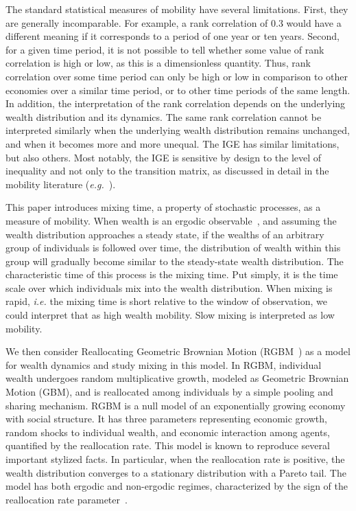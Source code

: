 \documentclass[11pt]{article}
\newcommand{\ie}{{\it i.e.}\xspace}
\newcommand{\eg}{{\it e.g.}\xspace}
\numberwithin{equation}{section}
\begin{document}
The standard statistical measures of mobility have several limitations. First, they are generally incomparable. For example, a rank correlation of 0.3 would have a different meaning if it corresponds to a period of one year or ten years. Second, for a given time period, it is not possible to tell whether some value of rank correlation is high or low, as this is a dimensionless quantity. Thus, rank correlation over some time period can only be high or low in comparison to other economies over a similar time period, or to other time periods of the same length.
In addition, the interpretation of the rank correlation depends on the underlying wealth distribution and its dynamics. The same rank correlation cannot be interpreted similarly when the underlying wealth distribution remains unchanged, and when it becomes more and more unequal.
The IGE has similar limitations, but also others. Most notably, the IGE is sensitive by design to the level of inequality and not only to the transition matrix, as discussed in detail in the mobility literature (\eg~\citet{chettyETAL2014}).

This paper introduces mixing time, a property of stochastic processes, as a measure of mobility. When wealth is an ergodic observable~\citep{PetersAdamou2018c}, and assuming the wealth distribution approaches a steady state, if the wealths of an arbitrary group of individuals is followed over time, the distribution of wealth within this group will gradually become similar to the steady-state wealth distribution. The characteristic time of this process is the mixing time. Put simply, it is the time scale over which individuals mix into the wealth distribution. When mixing is rapid, \ie the mixing time is short relative to the window of observation, we could interpret that as high wealth mobility. Slow mixing is interpreted as low mobility.

We then consider Reallocating Geometric Brownian Motion (RGBM~\citep{MarsiliMaslovZhang1998,LiuSerota2017,BermanPetersAdamou2019}) as a model for wealth dynamics and study mixing in this model. In RGBM, individual wealth undergoes random multiplicative growth, modeled as Geometric Brownian Motion (GBM), and is reallocated among individuals by a simple pooling and sharing mechanism. RGBM is a null model of an exponentially growing economy with social structure. It has three parameters representing economic growth, random shocks to individual wealth, and economic interaction among agents, quantified by the reallocation rate. This model is known to reproduce several important stylized facts. In particular, when the reallocation rate is positive, the wealth distribution converges to a stationary distribution with a Pareto tail. The model has both ergodic and non-ergodic regimes, characterized by the sign of the reallocation rate parameter~\citep{BermanPetersAdamou2019}.
\end{document}
